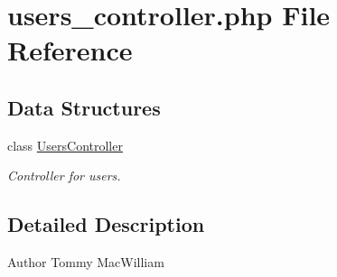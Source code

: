 \hypertarget{users__controller_8php}{
\section{users\_\-controller.php File Reference}
\label{users__controller_8php}
}
\subsection*{Data Structures}
\begin{DoxyCompactItemize}
\item 
class \hyperlink{class_users_controller}{UsersController}
\begin{DoxyCompactList}\small\item\em Controller for users. \item\end{DoxyCompactList}\end{DoxyCompactItemize}


\subsection{Detailed Description}
\begin{DoxyAuthor}{Author}
Tommy MacWilliam 
\end{DoxyAuthor}
